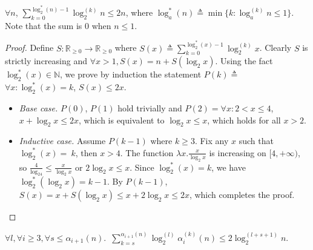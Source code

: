 \begin{lem}
	$\forall n$, $\displaystyle \sum_{k = 0}^{\log_2^*(n) - 1}\log_2^{(k)}n \le 2n$, where $\log_a^*(n) \triangleq \min\{k : \log_a^{(k)}n \le 1\}$. Note that the sum is $0$ when $n\le 1$.
\end{lem}
\begin{proof}
	Define $S: \mathbb{R}_{\ge 0}\to \mathbb{R}_{\ge 0}$ where $S(x) \triangleq \sum_{k = 0}^{\log_2^*(x) - 1}\log_2^{(k)}x$. Clearly $S$ is strictly increasing and $\forall x>1, S(x) = n + S(\log_2 x)$. Using the fact $\log_2^*(x)\in \mathbb{N}$, we prove by induction the statement $P(k) \triangleq$ $\forall x: \log_2^*(x) = k$, $S(x)\le 2x$.
	\begin{itemize}
		\item \emph{Base case.} $P(0)$, $P(1)$ hold trivially and $P(2) = \forall x: 2 < x \le 4$, \linebreak $x + \log_2x \le 2x$, which is equivalent to $\log_2x \le x$, which holds for all $x > 2$.
		
		\item \emph{Inductive case.} Assume $P(k-1)$ where $k\ge 3$. Fix any $x$ such that $\log_2^*(x)=~k$, then $x > 4$. The function $\lambda x.\frac{x}{\log_2x}$ is increasing on $[4, +\infty)$, so $\frac{4}{\log_24} \le \frac{x}{\log_2x}$ or $2\log_2x \le x$. Since $\log_2^*(x) = k$, we have $\log_2^*(\log_2x) = k-1$. By $P(k-1)$, $S(x) = x + S(\log_2x) \le x + 2\log_2x \le 2x$, which completes the proof.
	\end{itemize}
\end{proof}
\begin{lem} \label{lem: sum-alpha-repeat}
	$\forall l, \forall i \ge 3, \forall s\le \alpha_{i+1}(n)$.~$\displaystyle \sum_{k=s}^{\alpha_{i+1}(n)} \log_2^{(l)}\alpha_i^{(k)}(n) \le 2\log_2^{(l+s+1)}n$.
\end{lem}
